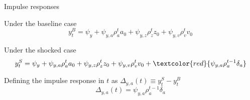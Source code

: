 \documentclass{beamer}
\begin{document}
	
\begin{frame}{Impulse responses}

Under the baseline case
\[
y^{B}_{t} = \psi_{y} + \psi_{y,a} \rho_{a}^{t} a_{0} + \psi_{y,z} \rho_{z}^{t} z_{0} + \psi_{y,v} \rho_{v}^{t} v_{0}
\]

\vspace{2mm}
Under the shocked case
\[
y^{S}_{t} = \psi_{y} + \psi_{y,a} \rho_{a}^{t} a_{0} + \psi_{y,z} \rho_{z}^{t} z_{0} + \psi_{y,v} \rho_{v}^{t} v_{0} +  \textcolor{red}{\psi_{y,a} \rho_{a}^{t-1} \delta_{a}}
\]

\vspace{2mm}
Defining the impulse response in $t$ as $\Delta_{y,a} (t) \equiv y^{S}_{t} - y^{B}_{t}$
\[
\Delta_{y,a} (t) = \psi_{y,a} \rho_{a}^{t-1} \delta_{a}
\]


\end{frame}

%
%	
%
%
%
%
\end{document}

